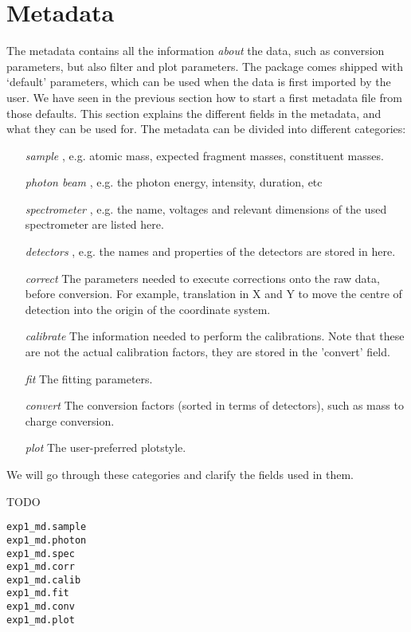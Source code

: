 \section{Metadata}
The metadata contains all the information \emph{about} the data, such as conversion parameters, but also filter and plot parameters. The package comes shipped with `default' parameters, which can be used when the data is first imported by the user. We have seen in the previous section how to start a first metadata file from those defaults. This section explains the different fields in the metadata, and what they can be used for. The metadata can be divided into different categories:

\begin{itemize}
\item[\emph{sample}], e.g. atomic mass, expected fragment masses, constituent masses.
\item[\emph{photon beam}], e.g. the photon energy, intensity, duration, etc
\item[\emph{spectrometer}],  e.g. the name, voltages and relevant dimensions of the used spectrometer are listed here.
\item[\emph{detectors}], e.g. the names and properties of the detectors are stored in here.
\item[\emph{correct}] The parameters needed to execute corrections onto the raw data, before conversion. For example, translation in X and Y to move the centre of detection into the origin of the coordinate system.
\item[\emph{calibrate}] The information needed to perform the calibrations. Note that these are not the actual calibration factors, they are stored in the 'convert' field.
\item[\emph{fit}] The fitting parameters.
\item[\emph{convert}] The conversion factors (sorted in terms of detectors), such as mass to charge conversion.
\item[\emph{plot}] The user-preferred plotstyle.
\end{itemize}

We will go through these categories and clarify the fields used in them.

TODO

\lstset{language=MATLAB}
\begin{lstlisting}
exp1_md.sample
exp1_md.photon
exp1_md.spec
exp1_md.corr
exp1_md.calib
exp1_md.fit
exp1_md.conv
exp1_md.plot
\end{lstlisting}
